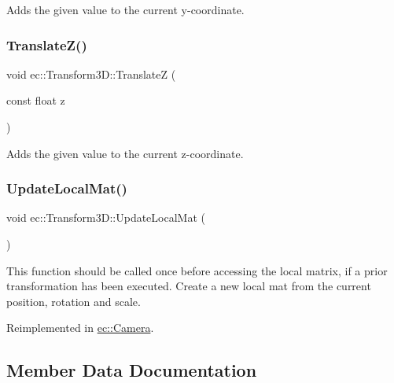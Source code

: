Adds the given value to the current y-\/coordinate. \mbox{\label{classec_1_1_transform3_d_a33c653dddfd16ec7481f1b1313a4505e}} 
\subsubsection{\texorpdfstring{Translate\+Z()}{TranslateZ()}}
{\footnotesize\ttfamily void ec\+::\+Transform3\+D\+::\+TranslateZ (\begin{DoxyParamCaption}\item[{const float}]{z }\end{DoxyParamCaption})}

Adds the given value to the current z-\/coordinate. \mbox{\label{classec_1_1_transform3_d_a9af1af38089385c5b2100fe5f98f33ca}} 
\subsubsection{\texorpdfstring{Update\+Local\+Mat()}{UpdateLocalMat()}}
{\footnotesize\ttfamily void ec\+::\+Transform3\+D\+::\+Update\+Local\+Mat (\begin{DoxyParamCaption}{ }\end{DoxyParamCaption})\hspace{0.3cm}{\ttfamily [virtual]}}

This function should be called once before accessing the local matrix, if a prior transformation has been executed. Create a new local mat from the current position, rotation and scale. 

Reimplemented in \mbox{\hyperlink{classec_1_1_camera_ab9b2d59d1755a56d67c13a5539b7e033}{ec\+::\+Camera}}.



\subsection{Member Data Documentation}
\mbox{\label{classec_1_1_transform3_d_a5d7ebb5dc842dc73fe0840f3e3f95ab8}} 
